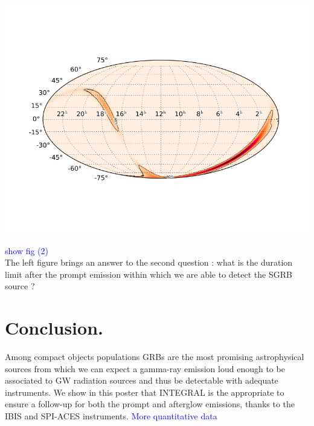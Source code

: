 \documentclass[a0,portrait]{a0poster}
\begin{document}
\begin{multicols}{2}
\begin{center}\vspace{.5cm}
    \includegraphics[scale=1.]{figures/test.png}
    \label{spectra}
\end{center}

 \textcolor{blue}{show fig (2)} \\
The left figure brings an answer to the second question : what is the duration limit after the prompt emission within which we are able to detect the SGRB source ? 

\section*{Conclusion.}

Among compact objects populations GRBs are the most promising astrophysical sources from which we can expect a gamma-ray emission loud enough to be associated to GW radiation sources and thus be detectable with adequate instruments. We show in this poster that INTEGRAL is the appropriate to ensure a follow-up for both the prompt and afterglow emissions, thanks to the IBIS and SPI-ACES instruments. \textcolor{blue}{More quantitative data}



\vspace{10mm}


\end{multicols}
\end{document}
